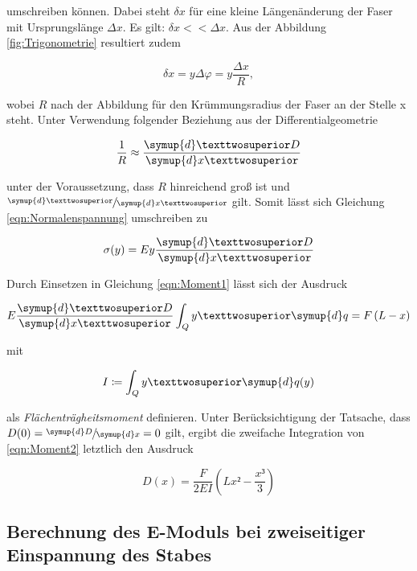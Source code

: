 \noindent umschreiben können. Dabei steht $\delta x$ für eine kleine Längenänderung der Faser mit Ursprungslänge $\Delta x$. Es gilt:
$\delta x << \Delta x$. Aus der Abbildung \ref{fig:Trigonometrie} resultiert zudem 

\begin{equation*}
    \delta x = y\Delta\varphi = y\frac{\Delta x}{R},
\end{equation*}

\noindent wobei $R$ nach der Abbildung für den Krümmungsradius der Faser an der Stelle x steht. Unter Verwendung folgender Beziehung aus der 
Differentialgeometrie

\begin{equation*}
    \frac{1}{R} \approx \frac{\symup{d}²D}{\symup{d}x²}
\end{equation*}

\noindent unter der Voraussetzung, dass $R$ hinreichend groß ist und $\sfrac{\symup{d}²}{\symup{d}x²}$ gilt. Somit lässt sich
Gleichung \eqref{eqn:Normalenspannung} umschreiben zu

\begin{equation*}
    \sigma(y) = Ey\frac{\symup{d}²D}{\symup{d}x²}
\end{equation*}

\noindent Durch Einsetzen in Gleichung \eqref{eqn:Moment1} lässt sich der Ausdruck

\begin{equation}
\label{eqn:Moment2}
    E\frac{\symup{d}²D}{\symup{d}x²}\int_Q y²\symup{d}q = F\left(L-x\right)
\end{equation}

\noindent mit

\begin{equation*}
    I \coloneqq \int_Q y²\symup{d}q(y)
\end{equation*}

\noindent als \emph{Flächenträgheitsmoment} definieren. Unter Berücksichtigung der Tatsache, dass $D(0) = \sfrac{\symup{d}D}{\symup{d}x} = 0$ gilt, ergibt die zweifache Integration
von \eqref{eqn:Moment2} letztlich den Ausdruck

\begin{equation}
    D(x) = \frac{F}{2EI}\left(Lx²-\frac{x³}{3}\right)
    \label{eqn:Biegung_einseitig}
\end{equation}

\subsection{Berechnung des E-Moduls bei zweiseitiger Einspannung des Stabes}

